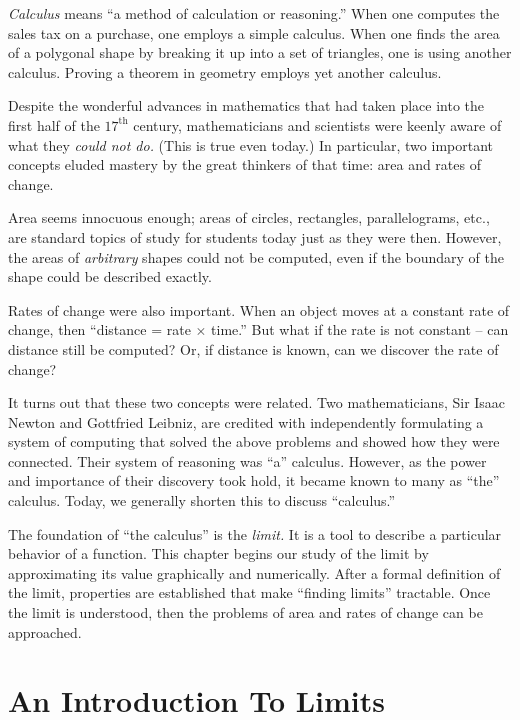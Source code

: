 \textit{Calculus} means ``a method of calculation or reasoning.'' When one computes the sales tax on a purchase, one employs a simple calculus. When one finds the area of a polygonal shape by breaking it up into a set of triangles, one is using another calculus. Proving a theorem in geometry employs yet another calculus.

Despite the wonderful advances in mathematics that had taken place into the first half of the $17^\text{th}$ century, mathematicians and scientists were keenly aware of what they \textit{could not do.} (This is true even today.) In particular, two important concepts eluded mastery by the great thinkers of that time: area and rates of change. 

Area seems innocuous enough; areas of circles, rectangles, parallelograms, etc., are standard topics of study for students today just as they were then. However, the areas of \textit{arbitrary} shapes could not be computed, even if the boundary of the shape could be described exactly. 

Rates of change were also important. When an object moves at a constant rate of change, then ``distance = rate $\times $ time.'' But what if the rate is not constant -- can distance still be computed? Or, if distance is known, can we discover the rate of change?

It turns out that these two concepts were related. Two mathematicians, Sir Isaac Newton and Gottfried Leibniz, are credited with independently formulating a system of computing that solved the above problems and showed how they were connected. Their system of reasoning was ``a'' calculus. However, as the power and importance of their discovery took hold, it became known to many as ``the'' calculus. Today, we generally shorten this to discuss ``calculus.''

The foundation of ``the calculus'' is the \textit{limit.} It is a tool to describe a particular behavior of a function. This chapter begins our study of the limit by approximating its value graphically and numerically. After a formal definition of the limit, properties are established that make ``finding limits'' tractable. Once the limit is understood, then the problems of area and rates of change can be approached.



\section{An Introduction To Limits}\label{sec:limit_intro}


